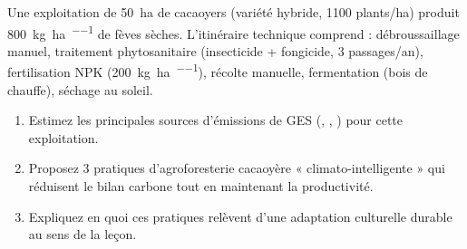 \documentclass[11pt]{article}
\begin{document}
\begin{exercice}
Une exploitation de \SI{50}{\hectare} de cacaoyers (variété hybride, \num{1100} plants/ha) produit \SI{800}{\kilo\gram\per\hectare\per\an} de fèves sèches. L'itinéraire technique comprend : débroussaillage manuel, traitement phytosanitaire (insecticide + fongicide, 3 passages/an), fertilisation NPK (\SI{200}{\kilo\gram\per\hectare\per\an}), récolte manuelle, fermentation (bois de chauffe), séchage au soleil. 
\begin{enumerate}
    \item Estimez les principales sources d'émissions de GES (, , ) pour cette exploitation.
    \item Proposez 3 pratiques d'agroforesterie cacaoyère « climato-intelligente » qui réduisent le bilan carbone tout en maintenant la productivité.
    \item Expliquez en quoi ces pratiques relèvent d'une adaptation culturelle durable au sens de la leçon.
\end{enumerate}
\end{exercice}
\end{document}
